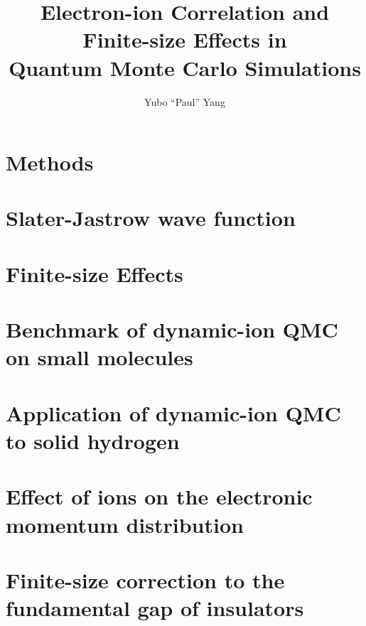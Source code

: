 \documentclass[draftthesis,fullpage]{uiucthesis}
\theoremstyle{definition}
\begin{document}
\title{Electron-ion Correlation and Finite-size Effects in\\
       Quantum Monte Carlo Simulations}
\author{Yubo ``Paul'' Yang}
\phdthesis
{}

%
\tableofcontents
%
\mainmatter



\chapter{Methods} \label{chap:method}



\chapter{Slater-Jastrow wave function} \label{chap:sj-wf}


\chapter{Finite-size Effects} \label{chap:fsc}


\chapter{Benchmark of dynamic-ion QMC on small molecules} \label{chap:na-mol}
%

\chapter{Application of dynamic-ion QMC to solid hydrogen} \label{chap:hsolid}
%

\chapter{Effect of ions on the electronic momentum distribution} \label{chap:licp}
%

\chapter{Finite-size correction to the fundamental gap of insulators} \label{chap:gap}
%

\printbibliography
\end{document}
